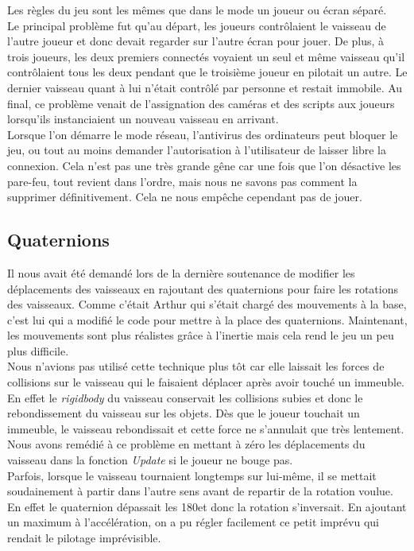 \documentclass[10pt, titlepage]{report}
\begin{document}
Les règles du jeu sont les mêmes que dans le mode un joueur ou écran séparé.\\

Le principal problème fut qu'au départ, les joueurs contrôlaient le vaisseau de l'autre joueur et donc devait regarder sur l'autre écran pour jouer. De plus, à trois joueurs, les deux premiers connectés voyaient un seul et même vaisseau qu'il contrôlaient tous les deux pendant que le troisième joueur en pilotait un autre. Le dernier vaisseau quant à lui n'était contrôlé par personne et restait immobile. Au final, ce problème venait de l'assignation des caméras et des scripts aux joueurs lorsqu'ils instanciaient un nouveau vaisseau en arrivant.\\

Lorsque l'on démarre le mode réseau, l'antivirus des ordinateurs peut bloquer le jeu, ou tout au moins demander l'autorisation à l'utilisateur de laisser libre la connexion. Cela n'est pas une très grande gêne car une fois que l'on désactive les pare-feu, tout revient dans l'ordre, mais nous ne savons pas comment la supprimer définitivement. Cela ne nous empêche cependant pas de jouer.\\

\subsection{Quaternions}
Il nous avait été demandé lors de la dernière soutenance de modifier les déplacements des vaisseaux en rajoutant des quaternions pour faire les rotations des vaisseaux. Comme c'était Arthur qui s'était chargé des mouvements à la base, c'est lui qui a modifié le code pour mettre à la place des quaternions. Maintenant, les mouvements sont plus réalistes grâce à l'inertie mais cela rend le jeu un peu plus difficile.\\

Nous n'avions pas utilisé cette technique plus tôt car elle laissait les forces de collisions sur le vaisseau qui le faisaient déplacer après avoir touché un immeuble. En effet le \textit{rigidbody} du vaisseau conservait les collisions subies et donc le rebondissement du vaisseau sur les objets. Dès que le joueur touchait un immeuble, le vaisseau rebondissait et cette force ne s'annulait que très lentement. Nous avons remédié à ce problème en mettant à zéro les déplacements du vaisseau dans la fonction \textit{Update} si le joueur ne bouge pas.\\

Parfois, lorsque le vaisseau tournaient longtemps sur lui-même, il se mettait soudainement à partir dans l'autre sens avant de repartir de la rotation voulue. En effet le quaternion dépassait les 180\textdegree  et donc la rotation s'inversait. En ajoutant un maximum à l'accélération, on a pu régler facilement ce petit imprévu qui rendait le pilotage imprévisible.\\
\end{document}
